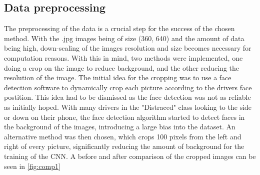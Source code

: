 \subsection{Data preprocessing}
The preprocessing of the data is a crucial step for the success of the chosen method. With the .jpg images being of size (360, 640) and the amount of data being high, down-scaling of the images resolution and size becomes necessary for computation reasons. With this in mind, two methods were implemented, one doing a crop on the image to reduce background, and the other reducing the resolution of the image. 
The initial idea for the cropping was to use a face detection software to dynamically crop each picture according to the drivers face postition. This idea had to be dismissed as the face detection was not as reliable as initially hoped. With many drivers in the "Distraced" class looking to the side or down on their phone, the face detection algorithm started to detect faces in the background of the images, introducing a large bias into the dataset. 
An alternative method was then chosen, which crops 100 pixels from the left and right of every picture, significantly reducing the amount of background for the training of the CNN. A before and after comparison of the cropped images can be seen in \autoref{fig:comp1}
